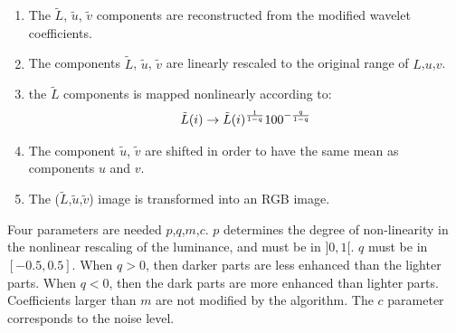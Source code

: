\begin{enumerate}
\item The $\tilde L$, $\tilde u$, $\tilde v$ components are reconstructed 
from the modified wavelet coefficients.
\item The components $\tilde L$, $\tilde u$, $\tilde v$  are linearly
rescaled to the original range of $L$,$u$,$v$.
\item the $\tilde L$ components  is mapped nonlinearly according to:
\begin{eqnarray}
  \tilde L(i) \rightarrow \tilde L(i)^{1 \over 1-q} 100^{- {q \over {1-q}}}
\end{eqnarray}
\item The component $\tilde u$, $\tilde v$ are shifted in order to have the
same mean as components $u$ and $v$.
\item The ($\tilde L$,$\tilde u$,$\tilde v$) image is transformed into
an RGB image.
\end{enumerate}
Four parameters are needed $p$,$q$,$m$,$c$. 
$p$ determines the degree of non-linearity in the nonlinear rescaling
of the luminance, and must be in $]0,1[$. $q$ must be in $[-0.5,0.5]$.
When $q > 0$, then darker parts are less enhanced than the lighter parts.
When $ q < 0$, then the dark parts are more enhanced than lighter parts.
Coefficients larger than $m$ are not modified by the algorithm.
The $c$ parameter corresponds to the noise level. \\

